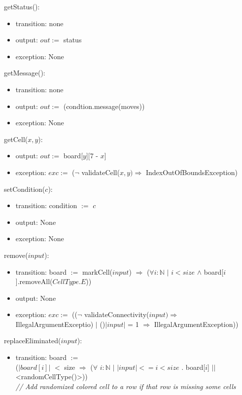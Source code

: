 \documentclass[12pt]{article}
\begin{document}
\noindent getStatus():
\begin{itemize}
\item transition: none
\item output: $out :=$ status
\item exception: None
\end{itemize}

\noindent getMessage():
\begin{itemize}
\item transition: none
\item output: $out :=$ (condtion.message(moves))
\item exception: None
\end{itemize}

\noindent getCell($x, y$):
\begin{itemize}
\item output: $out :=$ board[$y$][7 - $x$]
\item exception: $exc :=$ ($\neg$ validateCell($x, y) \Rightarrow$ IndexOutOfBoundsException)
\end{itemize}

\noindent setCondition($c$):
\begin{itemize}
\item transition: condition $:=$ $c$
\item output: None
\item exception: None
\end{itemize}

\noindent remove($input$):
\begin{itemize}
  \item transition: board $:=$ markCell($input$) $\Rightarrow$ ($\forall i : \mathbb{N}$ $|$ $i < size$ $\wedge$ board[$i$].removeAll($CellType.E$))
  \item output: None
  \item exception: $exc :=$ (($\neg$ validateConnectivity($input) \Rightarrow$ IllegalArgumentExceptio) $|$ ()$|input|$ = 1 $\Rightarrow$ IllegalArgumentException))
\end{itemize}

\noindent replaceEliminated($input$):
\begin{itemize}
\item transition: board $:=$\\
  ($|board[i]|$ $<$ size $\Rightarrow$ ($\forall$ $i : \mathbb{N}$ $|$ $|input| <= i < size$ . board[$i$] $||$ <randomCellType()>)) \\
  \medskip
  \textit{// Add randomized colored cell to a row if that row is missing some cells}
\end{itemize}
\end{document}
